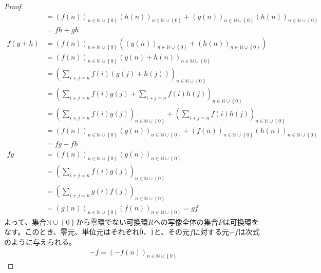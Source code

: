 \documentclass[dvipdfmx]{jsarticle}
\begin{document}
\begin{proof}
\begin{align*}
&= \left( f(n) \right)_{n \in \mathbb{N} \cup \left\{ 0 \right\}}\left( h(n) \right)_{n \in \mathbb{N} \cup \left\{ 0 \right\}} + \left( g(n) \right)_{n \in \mathbb{N} \cup \left\{ 0 \right\}}\left( h(n) \right)_{n \in \mathbb{N} \cup \left\{ 0 \right\}}\\
&= fh + gh\\
f(g + h) &= \left( f(n) \right)_{n \in \mathbb{N} \cup \left\{ 0 \right\}}\left( \left( g(n) \right)_{n \in \mathbb{N} \cup \left\{ 0 \right\}} + \left( h(n) \right)_{n \in \mathbb{N} \cup \left\{ 0 \right\}} \right)\\
&= \left( f(n) \right)_{n \in \mathbb{N} \cup \left\{ 0 \right\}}\left( g(n) + h(n) \right)_{n \in \mathbb{N} \cup \left\{ 0 \right\}}\\
&= \left( \sum_{i + j = n} {f(i)\left( g(j) + h(j) \right)} \right)_{n \in \mathbb{N} \cup \left\{ 0 \right\}}\\
&= \left( \sum_{i + j = n} {f(i)g(j)} + \sum_{i + j = n} {f(i)h(j)} \right)_{n \in \mathbb{N} \cup \left\{ 0 \right\}}\\
&= \left( \sum_{i + j = n} {f(i)g(j)} \right)_{n \in \mathbb{N} \cup \left\{ 0 \right\}} + \left( \sum_{i + j = n} {f(i)h(j)} \right)_{n \in \mathbb{N} \cup \left\{ 0 \right\}}\\
&= \left( f(n) \right)_{n \in \mathbb{N} \cup \left\{ 0 \right\}}\left( g(n) \right)_{n \in \mathbb{N} \cup \left\{ 0 \right\}} + \left( f(n) \right)_{n \in \mathbb{N} \cup \left\{ 0 \right\}}\left( h(n) \right)_{n \in \mathbb{N} \cup \left\{ 0 \right\}}\\
&= fg + fh\\
fg &= \left( f(n) \right)_{n \in \mathbb{N} \cup \left\{ 0 \right\}}\left( g(n) \right)_{n \in \mathbb{N} \cup \left\{ 0 \right\}}\\
&= \left( \sum_{i + j = n} {f(i)g(j)} \right)_{n \in \mathbb{N} \cup \left\{ 0 \right\}}\\
&= \left( \sum_{i + j = n} {g(i)f(j)} \right)_{n \in \mathbb{N} \cup \left\{ 0 \right\}}\\
&= \left( g(n) \right)_{n \in \mathbb{N} \cup \left\{ 0 \right\}}\left( f(n) \right)_{n \in \mathbb{N} \cup \left\{ 0 \right\}} = gf
\end{align*}
よって、集合$\mathbb{N} \cup \left\{ 0 \right\}$から零環でない可換環$R$への写像全体の集合$\widetilde{P}$は可換環をなす。このとき、零元、単位元はそれぞれ$\overline{0}$、$\overline{1}$と、その元$f$に対する元$- f$は次式のように与えられる。
\begin{align*}
- f = \left( - f(n) \right)_{n \in \mathbb{N} \cup \left\{ 0 \right\}}
\end{align*}
\end{proof}
\end{document}
